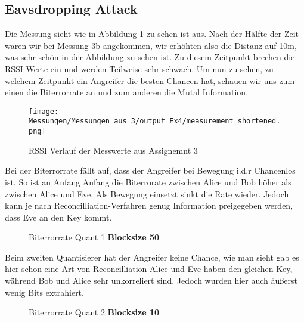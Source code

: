 \documentclass[12pt,a4paper]{article}
\begin{document}
\subsection*{Eavsdropping Attack}
Die Messung sieht wie in Abbildung \ref{test7} zu sehen ist aus. Nach der Hälfte der Zeit waren wir bei Messung 3b angekommen, wir erhöhten also die Distanz auf 10m, was sehr schön in der Abbildung zu sehen ist. Zu diesem Zeitpunkt brechen die RSSI Werte ein und werden Teilweise sehr schwach. Um nun zu sehen, zu welchem Zeitpunkt ein Angreifer die besten Chancen hat, schauen wir uns zum einen die Biterrorrate an und zum anderen die Mutal Information.
\begin{figure}[H]
\centering
\texttt{[image: Messungen/Messungen\_aus\_3/output\_Ex4/measurement\_shortened.png]}
\caption{RSSI Verlauf der Messwerte aus Assignemnt 3}
\label{test7}
\end{figure}
Bei der Biterrorrate fällt auf, dass der Angreifer bei Bewegung i.d.r Chancenlos ist. So ist an Anfang Anfang die Biterrorate zwischen Alice und Bob höher als zwischen Alice und Eve. Als Bewegung einsetzt sinkt die Rate wieder. Jedoch kann je nach Reconcilliation-Verfahren genug Information preigegeben werden, dass Eve an den Key kommt.
\begin{figure}[H]
\centering
{} \qquad
{}  
\caption{Biterrorrate Quant 1 \textbf{Blocksize 50}}
\label{fig:7}
\end{figure}
Beim zweiten Quantisierer hat der Angreifer keine Chance, wie man sieht gab es hier schon eine Art von Reconcilliation Alice und Eve haben den gleichen Key, während Bob und Alice sehr unkorreliert sind. Jedoch wurden hier auch äußerst wenig Bits extrahiert.
\begin{figure}[H]
\centering
{} \qquad
{}  
\caption{Biterrorrate Quant 2 \textbf{Blocksize 10}}
\label{fig:8}
\end{figure}
\end{document}
